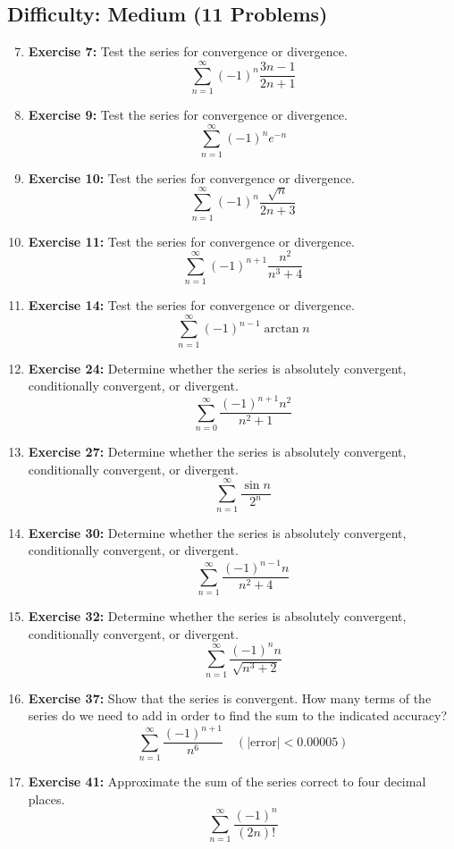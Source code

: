 \documentclass{article}
\begin{document}
\subsection*{Difficulty: Medium (11 Problems)}
\begin{enumerate}
    \setcounter{enumi}{6} %
    \item \textbf{Exercise 7:} Test the series for convergence or divergence.
    \[ \sum_{n=1}^{\infty} (-1)^n \frac{3n-1}{2n+1} \]
    
    \item \textbf{Exercise 9:} Test the series for convergence or divergence.
    \[ \sum_{n=1}^{\infty} (-1)^n e^{-n} \]
    
    \item \textbf{Exercise 10:} Test the series for convergence or divergence.
    \[ \sum_{n=1}^{\infty} (-1)^n \frac{\sqrt{n}}{2n+3} \]
    
    \item \textbf{Exercise 11:} Test the series for convergence or divergence.
    \[ \sum_{n=1}^{\infty} (-1)^{n+1} \frac{n^2}{n^3+4} \]
    
    \item \textbf{Exercise 14:} Test the series for convergence or divergence.
    \[ \sum_{n=1}^{\infty} (-1)^{n-1} \arctan n \]
    
    \item \textbf{Exercise 24:} Determine whether the series is absolutely convergent, conditionally convergent, or divergent.
    \[ \sum_{n=0}^{\infty} \frac{(-1)^{n+1} n^2}{n^2+1} \]
    
    \item \textbf{Exercise 27:} Determine whether the series is absolutely convergent, conditionally convergent, or divergent.
    \[ \sum_{n=1}^{\infty} \frac{\sin n}{2^n} \]
    
    \item \textbf{Exercise 30:} Determine whether the series is absolutely convergent, conditionally convergent, or divergent.
    \[ \sum_{n=1}^{\infty} \frac{(-1)^{n-1} n}{n^2+4} \]
    
    \item \textbf{Exercise 32:} Determine whether the series is absolutely convergent, conditionally convergent, or divergent.
    \[ \sum_{n=1}^{\infty} \frac{(-1)^n n}{\sqrt{n^3+2}} \]
    
    \item \textbf{Exercise 37:} Show that the series is convergent. How many terms of the series do we need to add in order to find the sum to the indicated accuracy?
    \[ \sum_{n=1}^{\infty} \frac{(-1)^{n+1}}{n^6} \quad (|\text{error}| < 0.00005) \]
    
    \item \textbf{Exercise 41:} Approximate the sum of the series correct to four decimal places.
    \[ \sum_{n=1}^{\infty} \frac{(-1)^n}{(2n)!} \]
\end{enumerate}
\end{document}
